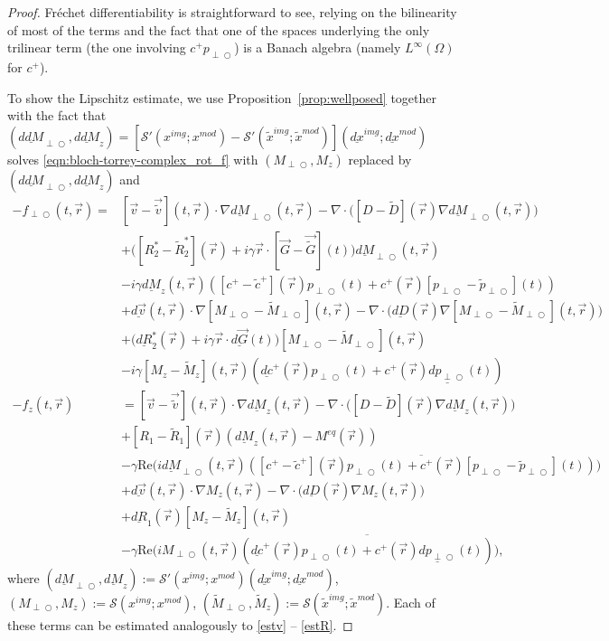 \documentclass[10pt,a4paper]{amsart}
\def\Mpp{M_{\perp\!\!\!\!\!\bigcirc}}
\def\Mpptil{\tilde{M}_{\perp\!\!\!\!\!\bigcirc}}
\renewcommand\Re{\mathrm{Re}}
\def\fpp{f_{\perp\!\!\!\!\!\bigcirc}}
\def\pp{p_{\perp\!\!\!\!\!\bigcirc}}
\def\pptil{\tilde{p}_{\perp\!\!\!\!\!\bigcirc}}
\newcommand{\uld}[1]{\underline{d#1}}
\def\uldMpp{\uld{M}_{\perp\!\!\!\!\!\bigcirc}}
\def\ulddMpp{\uld{dM}_{\perp\!\!\!\!\!\bigcirc}}
\begin{document}
\begin{proof}
Fr\'{e}chet differentiability is straightforward to see, relying on the bilinearity of most of the terms and the fact that one of the spaces underlying the only trilinear term (the one involving ${c}^+\pp$) is a Banach algebra (namely $L^\infty(\Omega)$ for ${c}^+$). 

To show the Lipschitz estimate, we use Proposition~\ref{prop:wellposed} together with the fact that
$(\ulddMpp,\uld{dM}_z)=[\mathcal{S}'(x^{img};x^{mod})-\mathcal{S}'(\tilde{x}^{img};\tilde{x}^{mod})](\uld{x}^{img};\uld{x}^{mod})$ solves \eqref{eqn:bloch-torrey-complex_rot_f} with $(\Mpp,M_z)$ replaced by $(\ulddMpp,\uld{dM}_z)$ and 
\[
\begin{aligned}
-\fpp(t, \vec r)=& 
[{\vec v}-\vec{\tilde{v}}](t, \vec r)\cdot\nabla \uldMpp(t, \vec r) 
-\nabla\cdot\bigl([D-\tilde{D}](\vec r) \nabla \uldMpp(t, \vec r)\bigr) \\
&+\bigl([R_2^*-\tilde{R}_2^*](\vec r)+i\gamma\vec r \cdot [{\vec G}-\vec{\tilde{G}}](t)\bigr)\uldMpp(t, \vec r)\\
&-i\gamma \uld{M}_z(t, \vec r)([c^+-\tilde{c}^+](\vec r)\pp(t)+c^+(\vec r)[\pp-\pptil](t))\\
&+\uld{\vec v}(t, \vec r)\cdot\nabla [\Mpp-\Mpptil](t, \vec r) 
-\nabla\cdot\bigl(\uld{D}(\vec r) \nabla [\Mpp-\Mpptil](t, \vec r)\bigr) \\
&+\bigl(\uld{R}_2^*(\vec r)+i\gamma\vec r \cdot \uld{\vec G}(t)\bigr)[\Mpp-\Mpptil](t, \vec r)\\
&-i\gamma [M_z-\tilde{M}_z](t, \vec r)(\uld{c}^+(\vec r)\pp(t)+c^+(\vec r)\uld{\pp}(t))
\\[1ex]    
-f_z(t, \vec r)&
=[{\vec v}-\vec{\tilde{v}}](t, \vec r)\cdot\nabla \uld{M}_z(t, \vec r) 
-\nabla\cdot\bigl([D-\tilde{D}](\vec r) \nabla \uld{M}_z(t, \vec r)\bigr) \\
&+[R_1-\tilde{R}_1](\vec r) (\uld{M}_z(t, \vec r)-M^{eq}(\vec r))\\
&-\gamma\Re\bigl(i\uldMpp(t, \vec r)\overline{([c^+-\tilde{c}^+](\vec r)\pp(t)+c^+(\vec r)[\pp-\pptil](t))}\bigr)\\
&+\uld{\vec v}(t, \vec r)\cdot\nabla M_z(t, \vec r) -\nabla\cdot\bigl(\uld{D}(\vec r) \nabla M_z(t, \vec r)\bigr) \\
&+\uld{R}_1(\vec r) [M_z-\tilde{M}_z](t, \vec r)\\
&-\gamma\Re\bigl(i\Mpp(t, \vec r)\overline{(\uld{c}^+(\vec r)\pp(t)+c^+(\vec r)\uld{\pp}(t))}\bigr),
\end{aligned}
\]
where $(\uldMpp,\uld{M}_z):=\mathcal{S}'(x^{img};x^{mod})(\uld{x}^{img};\uld{x}^{mod})$,
$(\Mpp,M_z):=\mathcal{S}(x^{img};x^{mod})$,
$(\Mpptil,\tilde{M}_z):=\mathcal{S}(\tilde{x}^{img};\tilde{x}^{mod})$.
Each of these terms can be estimated analogously to \eqref{estv}
-- \eqref{estR}.
\end{proof}
\end{document}
